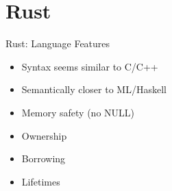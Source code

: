 \section{Rust}




\begin{frame}[c]{Rust: Language Features}
    \Large
    \begin{itemize}[<+(1)->]
        \item Syntax seems similar to C/C++
        \item Semantically closer to ML/Haskell
        \item Memory safety (no NULL)
        \item Ownership
        \item Borrowing
        \item Lifetimes
    \end{itemize}
\end{frame}




